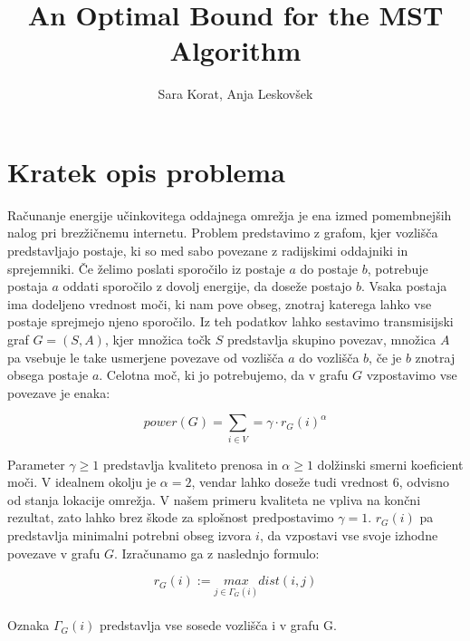 \documentclass[a4paper]{article}
\newcommand{\subtitle}[1]{%
  \posttitle{%
    \par\end{center}
    \begin{center}\large#1\end{center}
    \vskip3em}%
}
\begin{document}
\title{\textbf{\huge{An Optimal Bound for the MST Algorithm}}}
\subtitle{\textbf{\large{poročilo, 2. skupina}}}
\author{Sara Korat, Anja Leskovšek}


\maketitle 
\pagebreak

\tableofcontents

\pagebreak

\section{Kratek opis problema}

Računanje energije učinkovitega oddajnega omrežja je ena izmed pomembnejših nalog pri brezžičnemu internetu. Problem predstavimo z grafom, kjer vozlišča predstavljajo postaje, ki so med sabo povezane z radijskimi oddajniki in sprejemniki. Če želimo poslati sporočilo iz postaje $a$ do postaje $b$, potrebuje postaja $a$ oddati sporočilo z dovolj energije, da doseže postajo $b$. Vsaka postaja ima dodeljeno vrednost moči, ki nam pove obseg, znotraj katerega lahko vse postaje sprejmejo njeno sporočilo. Iz teh podatkov lahko sestavimo transmisijski graf $ G = (S, A)$, kjer množica točk $S$ predstavlja skupino povezav, množica $A$ pa vsebuje le take usmerjene povezave od vozlišča $a$ do vozlišča $b$, če je $b$ znotraj obsega postaje $a$. Celotna moč, ki jo potrebujemo, da v grafu $G$ vzpostavimo vse povezave je enaka: 

$$ power(G) = \sum_{i\in V} = \gamma \cdot r_G(i)^{\alpha} $$

Parameter $ \gamma \geq 1 $ predstavlja kvaliteto prenosa in $ \alpha \geq 1 $ dolžinski smerni koeficient moči. V idealnem okolju je $ \alpha = 2 $, vendar lahko doseže tudi vrednost 6, odvisno od stanja lokacije omrežja. V našem primeru kvaliteta ne vpliva na končni rezultat, zato lahko brez škode za splošnost predpostavimo $\gamma=1$. $r_G(i)$ pa predstavlja minimalni potrebni obseg izvora $i$, da vzpostavi vse svoje izhodne povezave v grafu $G$. Izračunamo ga z naslednjo formulo:

$$r_G(i) := \underset{j \in \Gamma_G(i)}{max} dist(i,j) $$
\\
Oznaka $ \Gamma_G(i) $ predstavlja vse sosede vozlišča i v grafu G.
\\
\end{document}
